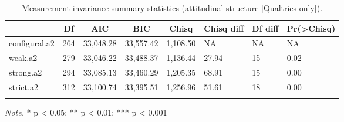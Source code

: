 \documentclass[
  english,
  man]{apa6}
\begin{document}
\begin{table}[tbp]

\begin{center}
\begin{threeparttable}

\caption{\label{tab:measinv.siop3.att}Measurement invariance summary statistics (attitudinal structure [Qualtrics only]).}

\begin{tabular}{llllllll}
\toprule
 & \multicolumn{1}{c}{Df} & \multicolumn{1}{c}{AIC} & \multicolumn{1}{c}{BIC} & \multicolumn{1}{c}{Chisq} & \multicolumn{1}{c}{Chisq diff} & \multicolumn{1}{c}{Df diff} & \multicolumn{1}{c}{Pr(>Chisq)}\\
\midrule
configural.a2 & 264 & 33,048.28 & 33,557.42 & 1,108.50 & NA & NA & NA\\
weak.a2 & 279 & 33,046.22 & 33,488.37 & 1,136.44 & 27.94 & 15 & 0.02\\
strong.a2 & 294 & 33,085.13 & 33,460.29 & 1,205.35 & 68.91 & 15 & 0.00\\
strict.a2 & 312 & 33,100.74 & 33,395.51 & 1,256.96 & 51.61 & 18 & 0.00\\
\bottomrule
\addlinespace
\end{tabular}

\begin{tablenotes}[para]
\normalsize{\textit{Note.} * p < 0.05; ** p < 0.01; *** p < 0.001}
\end{tablenotes}

\end{threeparttable}
\end{center}

\end{table}
\end{document}

